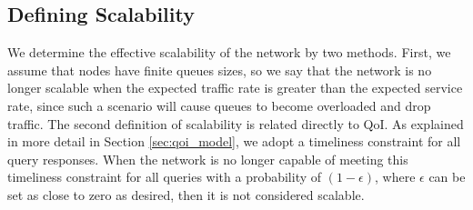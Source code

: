 \subsection{Defining Scalability}

We determine the effective scalability of the network by two methods.  First, we assume that nodes have finite queues sizes, so we say that the network is no longer scalable when the expected traffic rate is greater than the expected service rate, since such a scenario will cause queues to become overloaded and drop traffic.  The second definition of scalability is related directly to QoI.  As explained in more detail in Section \ref{sec:qoi_model}, we adopt a timeliness constraint for all query responses.  When the network is no longer capable of meeting this timeliness constraint for all queries with a probability of $(1-\epsilon)$, where $\epsilon$ can be set as close to zero as desired, then it is not considered scalable.  